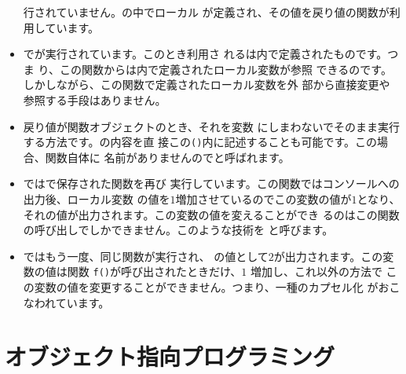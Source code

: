 \begin{itemize}
       行されていません。の中でローカル
       が定義され、その値を戻り値の関数が利用しています。
 \item {}でが実行されています。このとき利用さ
       れるは内で定義されたものです。つま
       り、この関数からは内で定義されたローカル変数が参照
       できるのです。しかしながら、この関数で定義されたローカル変数を外
       部から直接変更や参照する手段はありません。
 \item {}戻り値が関数オブジェクトのとき、それを変数
       にしまわないでそのまま実行する方法です。の内容を直
       接この\texttt{()}内に記述することも可能です。この場合、関数自体に
       名前がありませんのでと呼ばれます。
 \item {}ではで保存された関数を再び
       実行しています。この関数ではコンソールへの出力後、ローカル変数
       の値を$1$増加させているのでこの変数の値が$1$となり、
       それの値が出力されます。この変数の値を変えることができ
       るのはこの関数の呼び出しでしかできません。このような技術を
       と呼びます。
 \item {}ではもう一度、同じ関数が実行され、
       の値として$2$が出力されます。この変数の値は関数
       \texttt{f()}が呼び出されたときだけ、$1$ 増加し、これ以外の方法で
       この変数の値を変更することができません。つまり、一種のカプセル化
       がおこなわれています。
\end{itemize}

 \section{オブジェクト指向プログラミング}
